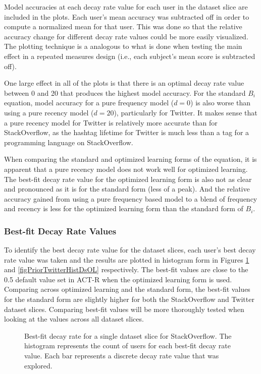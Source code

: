 \documentclass[man,floatsintext,donotrepeattitle]{apa6}
\begin{document}
Model accuracies at each decay rate value for each user in the dataset slice are included in the plots.
Each user's mean accuracy was subtracted off in order to compute a normalized mean for that user.
This was done so that the relative accuracy change for different decay rate values could be more easily visualized.
The plotting technique is a analogous to what is done when testing the main effect in a repeated measures design (i.e., each subject's mean score is subtracted off).

One large effect in all of the plots is that there is an optimal decay rate value between 0 and 20 that produces the highest model accuracy.
For the standard $B_{i}$ equation, model accuracy for a pure frequency model ($d=0$) is also worse than using a pure recency model ($d=20$), particularly for Twitter.
It makes sense that a pure recency model for Twitter is relatively more accurate than for StackOverflow, as the hashtag lifetime for Twitter is much less than a tag for a programming language on StackOverflow.

When comparing the standard and optimized learning forms of the equation, it is apparent that a pure recency model does not work well for optimized learning.
The best-fit decay rate value for the optimized learning form is also not as clear and pronounced as it is for the standard form (less of a peak).
And the relative accuracy gained from using a pure frequency based model to a blend of frequency and recency is less for the optimized learning form than the standard form of $B_{i}$.

\subsubsection{Best-fit Decay Rate Values}

To identify the best decay rate value for the dataset slices,
each user's best decay rate value was taken and the results are plotted in histogram form in Figures \ref{figPriorSOQHistDsOL} and \ref{figPriorTwitterHistDsOL} respectively.
The best-fit values are close to the \num{0.5} default value set in ACT-R when the optimized learning form is used.
Comparing across optimized learning and the standard form, the best-fit values for the standard form are slightly higher for both the StackOverflow and Twitter dataset slices.
Comparing best-fit values will be more thoroughly tested when looking at the values across all dataset slices.

\begin{figure}[!htbp]
  {%
    \setlength{\fboxsep}{0pt}%
    \setlength{\fboxrule}{1pt}%
    \hfill
    \hfill
    \caption{
      Best-fit decay rate for a single dataset slice for StackOverflow.
      The histogram represents the count of users for each best-fit decay rate value.
      Each bar represents a discrete decay rate value that was explored.
  }
    \label{figPriorSOQHistDsOL}
  }%
\end{figure}
\end{document}
